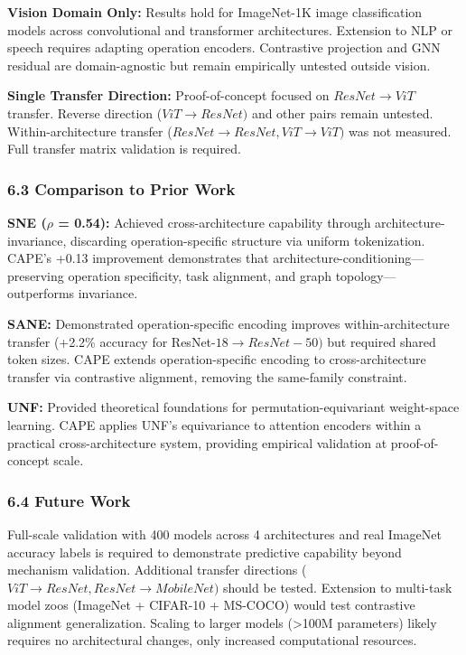 \textbf{Vision Domain Only:} Results hold for ImageNet-1K image classification models across convolutional and transformer architectures. Extension to NLP or speech requires adapting operation encoders. Contrastive projection and GNN residual are domain-agnostic but remain empirically untested outside vision.

\textbf{Single Transfer Direction:} Proof-of-concept focused on $ResNet\rightarrow ViT$ transfer. Reverse direction ($ViT\rightarrow ResNet)$ and other pairs remain untested. Within-architecture transfer ($ResNet\rightarrow ResNet, ViT\rightarrow ViT)$ was not measured. Full transfer matrix validation is required.

\subsubsection{6.3 Comparison to Prior Work}

\textbf{SNE ($\rho$ = 0.54):} Achieved cross-architecture capability through architecture-invariance, discarding operation-specific structure via uniform tokenization. CAPE's +0.13 improvement demonstrates that architecture-conditioning---preserving operation specificity, task alignment, and graph topology---outperforms invariance.

\textbf{SANE:} Demonstrated operation-specific encoding improves within-architecture transfer (+2.2\% accuracy for ResNet-$18\rightarrow ResNet-50)$ but required shared token sizes. CAPE extends operation-specific encoding to cross-architecture transfer via contrastive alignment, removing the same-family constraint.

\textbf{UNF:} Provided theoretical foundations for permutation-equivariant weight-space learning. CAPE applies UNF's equivariance to attention encoders within a practical cross-architecture system, providing empirical validation at proof-of-concept scale.

\subsubsection{6.4 Future Work}

Full-scale validation with 400 models across 4 architectures and real ImageNet accuracy labels is required to demonstrate predictive capability beyond mechanism validation. Additional transfer directions ($ViT\rightarrow ResNet, ResNet\rightarrow MobileNet)$ should be tested. Extension to multi-task model zoos (ImageNet + CIFAR-10 + MS-COCO) would test contrastive alignment generalization. Scaling to larger models (>100M parameters) likely requires no architectural changes, only increased computational resources.
